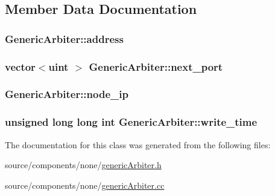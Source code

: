 \subsection{Member Data Documentation}
\hypertarget{classGenericArbiter_d570be8e0435c540c11f46cd9e68d8fc}{
\subsubsection[{address}]{ {\bf GenericArbiter::address}}}
\label{classGenericArbiter_d570be8e0435c540c11f46cd9e68d8fc}


\hypertarget{classGenericArbiter_2225ea6ef234e002fb69810552b02262}{
\subsubsection[{next\_\-port}]{\setlength{\rightskip}{0pt plus 5cm}vector$<${\bf uint} $>$ {\bf GenericArbiter::next\_\-port}}}
\label{classGenericArbiter_2225ea6ef234e002fb69810552b02262}


\hypertarget{classGenericArbiter_970eebd92edf4b43bd34dbe378aee0b4}{
\subsubsection[{node\_\-ip}]{ {\bf GenericArbiter::node\_\-ip}}}
\label{classGenericArbiter_970eebd92edf4b43bd34dbe378aee0b4}


\hypertarget{classGenericArbiter_c2b3b3256c40848d1e06cc15e15b7750}{
\subsubsection[{write\_\-time}]{\setlength{\rightskip}{0pt plus 5cm}unsigned long long int {\bf GenericArbiter::write\_\-time}}}
\label{classGenericArbiter_c2b3b3256c40848d1e06cc15e15b7750}




The documentation for this class was generated from the following files:\begin{CompactItemize}
\item 
source/components/none/\hyperlink{genericArbiter_8h}{genericArbiter.h}\item 
source/components/none/\hyperlink{genericArbiter_8cc}{genericArbiter.cc}\end{CompactItemize}

